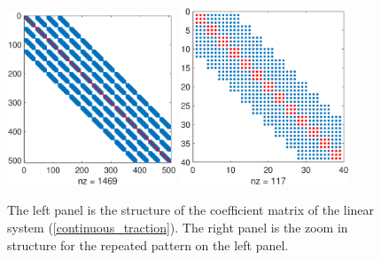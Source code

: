 \begin{figure}[H]
	\centering
	\includegraphics[width=0.45\textwidth,trim={0.6cm 1cm 1cm 1.2cm}, clip]{Mass_matrix.eps}
	\includegraphics[width=0.45\textwidth,trim={0.6cm 1cm 1cm 1.2cm}, clip]{Mass_diagonal_matrix.eps}
	\caption{The left panel is the structure of the coefficient matrix of the linear system (\ref{continuous_traction}). The right panel is the zoom in structure for the repeated pattern on the left panel.}\label{Mass_matrix}
\end{figure}
